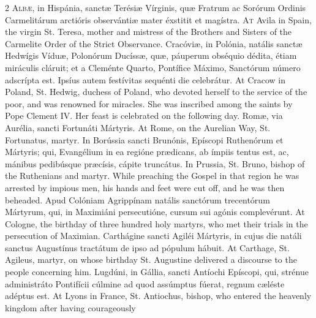 \begin{paracol}{2}
\lettrine[lines=2]{A}{lbæ,} in Hispánia, 
 sanctæ Terésiæ Vírginis, quæ Fratrum ac Sorórum Ordinis Carmelitárum 
 arctióris observántiæ mater éxstitit et magístra.
\switchcolumn
{}
\lettrine[lines=2]{A}{t} Avila in Spain, the virgin St. 
 Teresa, mother and mistress of the Brothers and Sisters of the Carmelite 
 Order of the Strict Observance.
\switchcolumn*
{}
Cracóviæ, in Polónia, 
 natális sanctæ Hedwígis Víduæ, Polonórum Ducíssæ, quæ, páuperum obséquio 
 dédita, étiam miráculis cláruit; et a Cleménte Quarto, Pontífice Máximo, 
 Sanctórum número adscrípta est. Ipsíus autem festívitas sequénti die 
 celebrátur.
\switchcolumn
{}
At Cracow in Poland, St. Hedwig, 
 duchess of Poland, who devoted herself to the service of the poor, and was 
 renowned for miracles. She was inscribed among the saints by Pope 
 Clement IV. Her feast is celebrated on the following day.
\switchcolumn*
{}
Romæ, via Aurélia, sancti Fortunáti Mártyris.
\switchcolumn
{}
At Rome, on the Aurelian Way, St. 
 Fortunatus, martyr.
\switchcolumn*
{}
In Borússia sancti 
 Brunónis, Epíscopi Ruthenórum et Mártyris; qui, Evangélium in ea regióne 
 prædicans, ab ímpiis tentus est, ac, mánibus pedibúsque præcísis, cápite 
 truncátus.
\switchcolumn
{}
In Prussia, St. Bruno, bishop of the 
 Ruthenians and martyr. While preaching the Gospel in that region he 
 was arrested by impious men, his hands and feet were cut off, and he was 
 then beheaded.
\switchcolumn*
{}
Apud Colóniam 
 Agrippínam natális sanctórum trecentórum Mártyrum, qui, in Maximiáni 
 persecutióne, cursum sui agónis complevérunt.
\switchcolumn
{}
At Cologne, the birthday of three 
 hundred holy martyrs, who met their trials in the persecution of Maximian.
\switchcolumn*
{}
Carthágine sancti 
 Agiléi Mártyris, in cujus die natáli sanctus Augustínus tractátum de ipso ad 
 pópulum hábuit.
\switchcolumn
{}
At Carthage, St. Agileus, martyr, on 
 whose birthday St. Augustine delivered a discourse to the people concerning 
 him.
\switchcolumn*
{}
Lugdúni, in Gállia, 
 sancti Antíochi Epíscopi, qui, strénue administráto Pontifícii cúlmine ad 
 quod assúmptus fúerat, regnum cæléste adéptus est.
\switchcolumn
{}
At Lyons in France, St. Antiochus, 
 bishop, who entered the heavenly kingdom after having courageously 

\end{paracol}
